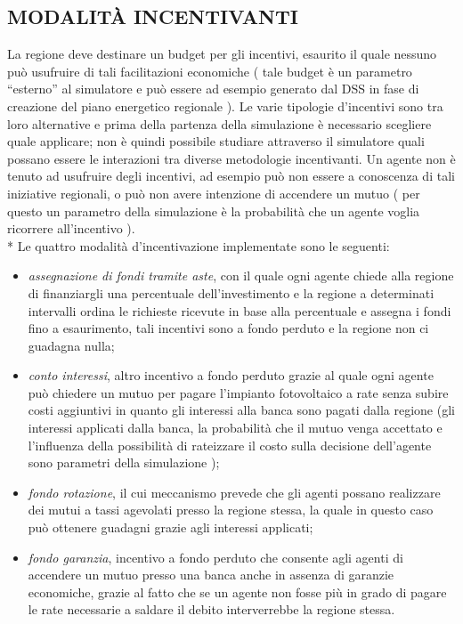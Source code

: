 \documentclass[12pt,a4paper,openright,twoside]{report}
\begin{document}
\subsection{MODALITÀ INCENTIVANTI}
La regione deve destinare un budget per gli incentivi, esaurito il quale nessuno può usufruire di tali facilitazioni economiche ( tale budget è un parametro “esterno” al simulatore e può essere ad esempio generato dal DSS in fase di creazione del piano energetico regionale ). Le varie tipologie d’incentivi sono tra loro alternative e prima della partenza della simulazione è necessario scegliere quale applicare; non è quindi possibile studiare attraverso il simulatore quali possano essere le interazioni tra diverse metodologie incentivanti. Un agente non è tenuto ad usufruire degli incentivi, ad esempio può non essere a conoscenza di tali iniziative regionali, o può non avere intenzione di accendere un mutuo ( per questo un parametro della simulazione è la probabilità che un agente voglia ricorrere all’incentivo ). \\*
Le quattro modalità d'incentivazione implementate sono le seguenti:\begin{itemize}
	\item \emph{assegnazione di fondi tramite aste}, con il quale ogni agente chiede alla regione di finanziargli una percentuale dell’investimento e la regione a determinati intervalli ordina le richieste ricevute in base alla percentuale e assegna i fondi fino a esaurimento, tali incentivi sono a fondo perduto e la regione non ci guadagna nulla;
	\item \emph{conto interessi}, altro incentivo a fondo perduto grazie al quale ogni agente può chiedere un mutuo per pagare l'impianto fotovoltaico a rate senza subire costi aggiuntivi in quanto gli interessi alla banca sono pagati dalla regione (gli interessi applicati dalla banca, la probabilità che il mutuo venga accettato e l'influenza della possibilità di rateizzare il costo sulla decisione dell'agente sono parametri della simulazione );
	\item \emph{fondo rotazione}, il cui meccanismo prevede che gli agenti possano realizzare dei mutui a tassi agevolati presso la regione stessa, la quale in questo caso può ottenere guadagni grazie agli interessi applicati;
	\item \emph{fondo garanzia}, incentivo a fondo perduto che consente agli agenti di accendere un mutuo presso una banca anche in assenza di garanzie economiche, grazie al fatto che se un agente non fosse più in grado di pagare le rate necessarie a saldare il debito interverrebbe la regione stessa.
\end{itemize}
\end{document}
